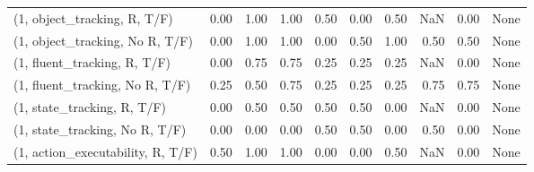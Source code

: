 \begin{table*}[h!]
\begin{adjustbox}{width=2\columnwidth,center}
\begin{tabular}{lrrr|rrr|rrr}
\midrule
(1, object\_tracking, R, T/F)         &                      0.00 &                  1.00 &                      1.00 &                          0.50 &                      0.00 &                          0.50 &                                    NaN &                               0.00 &                                  None \\
(1, object\_tracking, No R, T/F)      &                      0.00 &                  1.00 &                      1.00 &                          0.00 &                      0.50 &                          1.00 &                                   0.50 &                               0.50 &                                  None \\
(1, fluent\_tracking, R, T/F)         &                      0.00 &                  0.75 &                      0.75 &                          0.25 &                      0.25 &                          0.25 &                                    NaN &                               0.00 &                                  None \\
(1, fluent\_tracking, No R, T/F)      &                      0.25 &                  0.50 &                      0.75 &                          0.25 &                      0.25 &                          0.25 &                                   0.75 &                               0.75 &                                  None \\
(1, state\_tracking, R, T/F)          &                      0.00 &                  0.50 &                      0.50 &                          0.50 &                      0.50 &                          0.00 &                                    NaN &                               0.00 &                                  None \\
(1, state\_tracking, No R, T/F)       &                      0.00 &                  0.00 &                      0.00 &                          0.50 &                      0.50 &                          0.00 &                                   0.50 &                               0.00 &                                  None \\
(1, action\_executability, R, T/F)    &                      0.50 &                  1.00 &                      1.00 &                          0.00 &                      0.00 &                          0.50 &                                    NaN &                               0.00 &                                  None \\

\end{tabular}
\end{adjustbox}
\end{table*}
